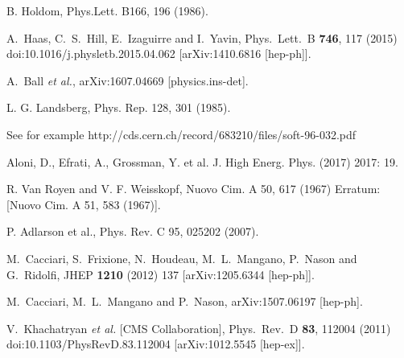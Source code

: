 \documentclass[12pt]{article}
\begin{document}
\begin{thebibliography}{1}


  B. Holdom, Phys.Lett. B166, 196 (1986).
  
  A.~Haas, C.~S.~Hill, E.~Izaguirre and I.~Yavin,
  Phys.\ Lett.\ B {\bf 746}, 117 (2015)
  doi:10.1016/j.physletb.2015.04.062
  [arXiv:1410.6816 [hep-ph]].

  A.~Ball {\it et al.},
  arXiv:1607.04669 [physics.ins-det].

  
  L. G. Landsberg, Phys. Rep. 128, 301 (1985). 

  See for example http://cds.cern.ch/record/683210/files/soft-96-032.pdf


Aloni, D., Efrati, A., Grossman, Y. et al. J. High Energ. Phys. (2017) 2017: 19. 

  R. Van Royen and V. F. Weisskopf, Nuovo Cim. A 50, 617 (1967) Erratum: [Nuovo Cim. A 51, 583 (1967)].

 P. Adlarson et al., Phys. Rev. C 95, 025202 (2007).

  M.~Cacciari, S.~Frixione, N.~Houdeau, M.~L.~Mangano, P.~Nason and G.~Ridolfi,
  JHEP {\bf 1210} (2012) 137 [arXiv:1205.6344 [hep-ph]].

  M.~Cacciari, M.~L.~Mangano and P.~Nason,
  arXiv:1507.06197 [hep-ph].

  V.~Khachatryan {\it et al.} [CMS Collaboration],
  Phys.\ Rev.\ D {\bf 83}, 112004 (2011)
  doi:10.1103/PhysRevD.83.112004
  [arXiv:1012.5545 [hep-ex]].


\end{thebibliography}
\end{document}
